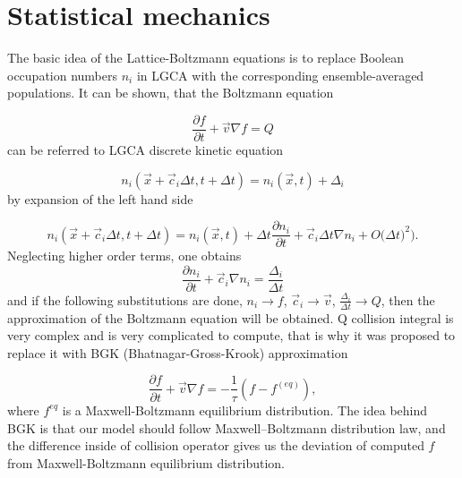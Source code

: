 
\section{Statistical mechanics}

The basic idea of the Lattice-Boltzmann equations is to replace Boolean occupation numbers $n_i$ in LGCA with the corresponding ensemble-averaged populations. It can be shown, that the Boltzmann equation

\begin{equation}
\frac{\partial f}{\partial t} + \vec{v} \nabla f = Q
\end{equation}
can be referred to LGCA discrete kinetic equation

\begin{equation}
n_i(\vec{x} + \vec{c}_i \Delta t, t + \Delta t) = n_i(\vec{x},t) +\Delta_i
\end{equation}
by expansion of the left hand side

\begin{equation}
n_i(\vec{x} + \vec{c}_i \Delta t, t + \Delta t) = n_i(\vec{x},t) + \Delta t \frac{\partial n_i}{\partial t} + \vec{c}_i \Delta{t} \nabla{n_i} + O\big(\Delta t)^2\big).
\end{equation}
Neglecting higher order terms, one obtains
\begin{equation}
\frac{\partial n_i}{\partial t} + \vec{c}_i \nabla{n_i} = \frac{\Delta_i}{\Delta t}
\end{equation}
and if the following  substitutions are done, $n_i \rightarrow f$, $\vec{c}_i \rightarrow \vec{v}$, $\frac{\Delta_i}{\Delta t} \rightarrow Q$, then the approximation of the Boltzmann equation will be obtained. Q collision integral is very complex and is very complicated to compute, that is why it was proposed to replace it with BGK (Bhatnagar-Gross-Krook) approximation

\begin{equation}
\frac{\partial f}{\partial t} + \vec{v} \nabla f = -\frac{1}{\tau}(f - f^{(eq)}),
\end{equation}
where $f^{eq}$ is a Maxwell-Boltzmann equilibrium distribution. The idea behind BGK is that our model should follow Maxwell–Boltzmann distribution law, and the difference inside of collision operator gives us the deviation of computed $f$ from Maxwell-Boltzmann equilibrium distribution.

